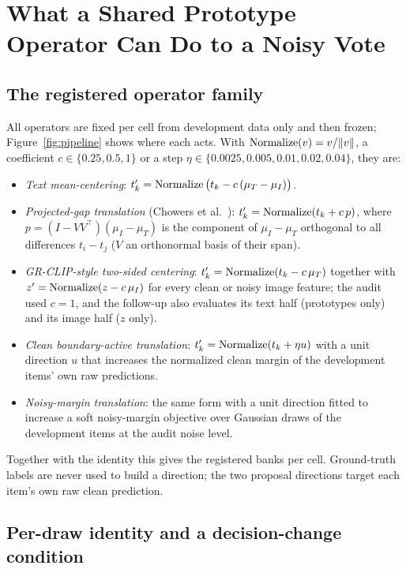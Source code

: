 \section{What a Shared Prototype Operator Can Do to a Noisy Vote}
\label{sec:operators}



\subsection{The registered operator family}
\label{sec:family}

All operators are fixed per cell from development data only and then frozen;
Figure~\ref{fig:pipeline} shows where each acts. With $\operatorname{Normalize}(v)=v/\lVert
v\rVert$, a coefficient $c\in\{0.25,0.5,1\}$ or a step
$\eta\in\{0.0025,0.005,0.01,0.02,0.04\}$, they are:
\begin{itemize}
\item \emph{Text mean-centering}: $t'_k=\operatorname{Normalize}\big(t_k-c\,(\mu_T-\mu_I)\big)$.
\item \emph{Projected-gap translation} (Chowers et al.~\cite{chowers2026bug}):
$t'_k=\operatorname{Normalize}(t_k+c\,p)$, where $p=(I-VV^{\top})(\mu_I-\mu_T)$ is the
component of $\mu_I-\mu_T$ orthogonal to all differences $t_i-t_j$
($V$ an orthonormal basis of their span).
\item \emph{GR-CLIP-style two-sided centering}: $t'_k=\operatorname{Normalize}(t_k-c\,\mu_T)$
together with $z'=\operatorname{Normalize}(z-c\,\mu_I)$ for every clean or noisy image
feature; the audit used $c=1$, and the follow-up also evaluates its text half
(prototypes only) and its image half ($z$ only).
\item \emph{Clean boundary-active translation}: $t'_k=\operatorname{Normalize}(t_k+\eta u)$
with a unit direction $u$ that increases the normalized clean margin of the
development items' own raw predictions.
\item \emph{Noisy-margin translation}: the same form with a unit direction fitted
to increase a soft noisy-margin objective over Gaussian draws of the development
items at the audit noise level.
\end{itemize}
Together with the identity this gives the \ExpCandidates{} registered banks per
cell. Ground-truth labels are never used to build a direction; the two proposal
directions target each item's own raw clean prediction.

\subsection{Per-draw identity and a decision-change condition}
\label{sec:flip}

